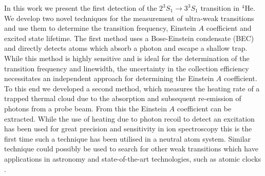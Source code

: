 \documentclass[%
 reprint,
 amsmath,amssymb,
 aps,
 prl,
]{revtex4-2}
\newcommand{\brycerev}[1]{{\color{Purple}{#1}\normalcolor}} %
\newcommand{\UpperState}{3^{3\!}S_1}%
\newcommand{\MetastableState}{2^{3\!}S_1}%
\begin{document}

In this work we present the first detection of the \(\MetastableState \rightarrow \UpperState\) transition in $^4$He. We develop two novel techniques for the measurement of ultra-weak transitions and use them to determine the transition frequency,
Einstein \(A\) coefficient and excited state lifetime. The first method uses a Bose-Einstein condensate (BEC) and directly detects atoms which absorb a photon and escape a shallow trap. While this method is highly sensitive and is ideal for the determination of the transition frequency and linewidth, the uncertainty in the collection efficiency necessitates an independent approach for determining the Einstein \(A\) coefficient. To this end we developed a second method, which measures the heating rate of a trapped thermal cloud due to the absorption and subsequent re-emission of photons from a probe beam. From this the Einstein \(A\) coefficient can be extracted. While the use of heating due to photon recoil to detect an excitation has been used for great precision and sensitivity in ion spectroscopy \cite{PhysRevLett.78.1876,Wan2014,PhysRevLett.115.053003,Guggemos_2019} this is the first time such a technique has been utilised in a neutral atom system.
Similar technique could possibly be used to search for other weak transitions which have applications in astronomy and state-of-the-art technologies, such as atomic clocks \cite{detection_note}.




\end{document}
